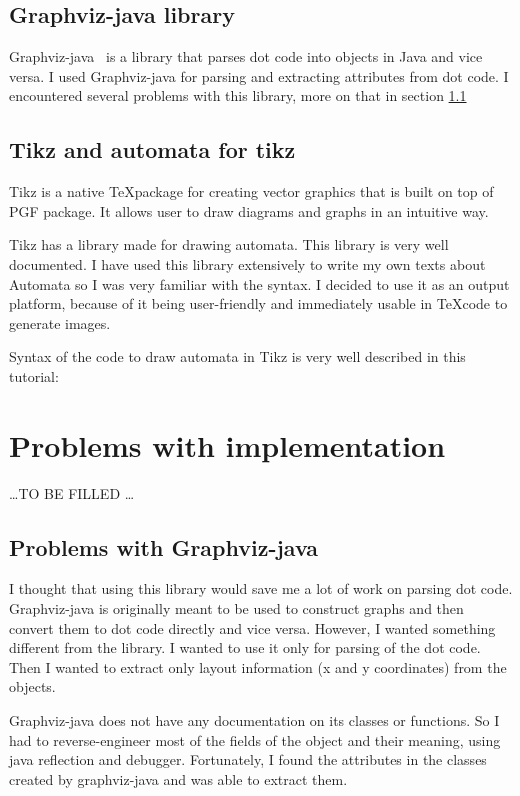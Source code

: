 \documentclass{ctuthesis}
\begin{document}
\subsection{Graphviz-java library}
Graphviz-java~\cite{graphviz-java} is a library that parses dot code into objects in Java and vice versa. I used Graphviz-java for parsing and extracting attributes from dot code. I encountered several problems with this library, more on that in section \ref{subsec:graphviz-java-problems}

\subsection{Tikz and automata for tikz}
Tikz is a native \TeX package for creating vector graphics that is built on top of PGF package. It allows user to draw diagrams and graphs in an intuitive way.

Tikz has a library made for drawing automata. This library is very well documented. I have used this library extensively to write my own texts about Automata so I was very familiar with the syntax. I decided to use it as an output platform, because of it being user-friendly and immediately usable in \TeX code to generate images.

Syntax of the code to draw automata in Tikz is very well described in this tutorial:~\cite{tikz-tut}

\section{Problems with implementation}
\ldots TO BE FILLED \ldots

\subsection{Problems with Graphviz-java}
\label{subsec:graphviz-java-problems}
I thought that using this library would save me a lot of work on parsing dot code. Graphviz-java is originally meant to be used to construct graphs and then convert them to dot code directly and vice versa. However, I wanted something different from the library. I wanted to use it only for parsing of the dot code. Then I wanted to extract only layout information (x and y coordinates) from the objects. 

Graphviz-java does not have any documentation on its classes or functions. So I had to reverse-engineer most of the fields of the object and their meaning, using java reflection and debugger. Fortunately, I found the attributes in the classes created by graphviz-java and was able to extract them. 
\end{document}
